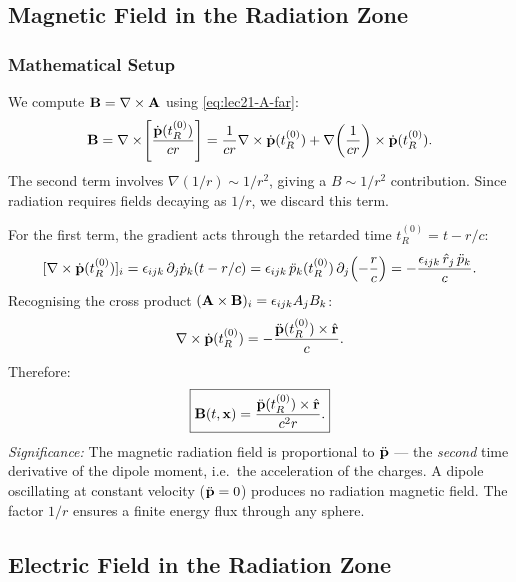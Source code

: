 \subsection{Magnetic Field in the Radiation Zone}
\label{subsec:lec21-B-field}

\subsubsection*{Mathematical Setup}
We compute $\mathbf{B} = \nabla\times\mathbf{A}$ using \eqref{eq:lec21-A-far}:
\[
  \mathbf{B} = \nabla\times\!\left[\frac{\dot{\mathbf{p}}(t_R^{(0)})}{cr}\right]
  = \frac{1}{cr}\nabla\times\dot{\mathbf{p}}(t_R^{(0)})
    + \nabla\!\left(\frac{1}{cr}\right)\times\dot{\mathbf{p}}(t_R^{(0)}).
\]
The second term involves $\nabla(1/r) \sim 1/r^2$, giving a $B\sim 1/r^2$
contribution. Since radiation requires fields decaying as $1/r$, we discard this term.

For the first term, the gradient acts through the retarded time
$t_R^{(0)} = t - r/c$:
\[
  [\nabla\times\dot{\mathbf{p}}(t_R^{(0)})]_i
  = \epsilon_{ijk}\,\partial_j\dot{p}_k(t - r/c)
  = \epsilon_{ijk}\,\ddot{p}_k(t_R^{(0)})\,\partial_j\!\left(-\frac{r}{c}\right)
  = -\frac{\epsilon_{ijk}\,\hat{r}_j\,\ddot{p}_k}{c}.
\]
Recognising the cross product $(\mathbf{A}\times\mathbf{B})_i = \epsilon_{ijk}A_jB_k$:
\[
  \nabla\times\dot{\mathbf{p}}(t_R^{(0)}) = -\frac{\ddot{\mathbf{p}}(t_R^{(0)})\times\hat{\mathbf{r}}}{c}.
\]
Therefore:
\begin{equation}\label{eq:lec21-B-rad}
  \boxed{\mathbf{B}(t,\mathbf{x}) = \frac{\ddot{\mathbf{p}}(t_R^{(0)})\times\hat{\mathbf{r}}}{c^2 r}.}
\end{equation}
\textit{Significance:} The magnetic radiation field is proportional to $\ddot{\mathbf{p}}$
--- the \emph{second} time derivative of the dipole moment, i.e.\ the acceleration of
the charges. A dipole oscillating at constant velocity ($\ddot{\mathbf{p}}=0$) produces no
radiation magnetic field. The factor $1/r$ ensures a finite energy flux through any
sphere.


\subsection{Electric Field in the Radiation Zone}
\label{subsec:lec21-E-field}

